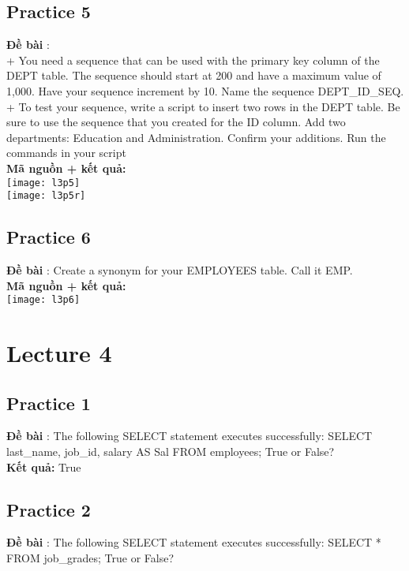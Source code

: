 \documentclass[a4paper]{report}
\begin{document}
\subsection{Practice 5}
\noindent
\textbf{Đề bài} : \\
+ You need a sequence that can be used with the primary key column of the DEPT table. The sequence should start at 200 and have a maximum value of 1,000. Have your sequence increment by 10. Name the sequence DEPT\_ID\_SEQ.  \\
+ To test your sequence, write a script to insert two rows in the DEPT table. Be sure to use the sequence that you created for the ID column. Add two departments: Education and Administration. Confirm your additions. Run the commands in your script\\

\textbf{Mã nguồn + kết quả: }\\
\texttt{[image: l3p5]}\\
\texttt{[image: l3p5r]}

\subsection{Practice 6}
\noindent
\textbf{Đề bài} : Create a synonym for your EMPLOYEES table. Call it EMP.
\\

\textbf{Mã nguồn + kết quả: }\\
\texttt{[image: l3p6]}

\section{Lecture 4}

\subsection{Practice 1}
\noindent
\textbf{Đề bài} : The following SELECT statement executes successfully: SELECT last\_name, job\_id, salary AS Sal FROM employees; True or False?\\

\textbf{Kết quả: } True
\subsection{Practice 2}
\noindent
\textbf{Đề bài} : The following SELECT statement executes successfully: SELECT * FROM job\_grades; True or False?\\
\end{document}

